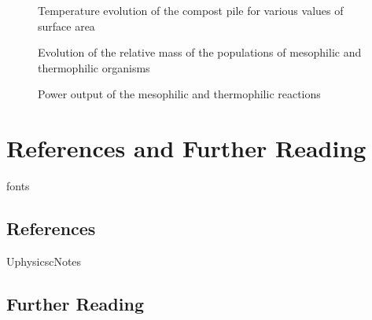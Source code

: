 \documentclass[12pt, a4paper, twocolumn]{article}
\numberwithin{table}{section}
\numberwithin{figure}{section}
\numberwithin{equation}{section}
\begin{document}
\begin{figure}[htb]
	\sffamily \footnotesize \centering
	
	\caption{Temperature evolution of the compost pile for various values of surface area}
	\label{fig:temp-arees}
\end{figure}

\begin{figure}[htb]
	\sffamily \footnotesize \centering
	
	\caption{Evolution of the relative mass of the populations of mesophilic and thermophilic organisms}
	\label{fig:poblacions}
\end{figure}

\begin{figure}[htb]
	\sffamily \footnotesize \centering
	
	\caption{Power output of the mesophilic and thermophilic reactions}
	\label{fig:potencies}
\end{figure}

\clearpage
\appendix
\section{References and Further Reading}
\begin{btSect}{fonts}
	
	\subsection*{References}	
	\btPrintCited
\end{btSect}

\begin{btSect}{UphysicscNotes}
	
	\subsection*{Further Reading}	
	\btPrintNotCited
\end{btSect}
\end{document}
